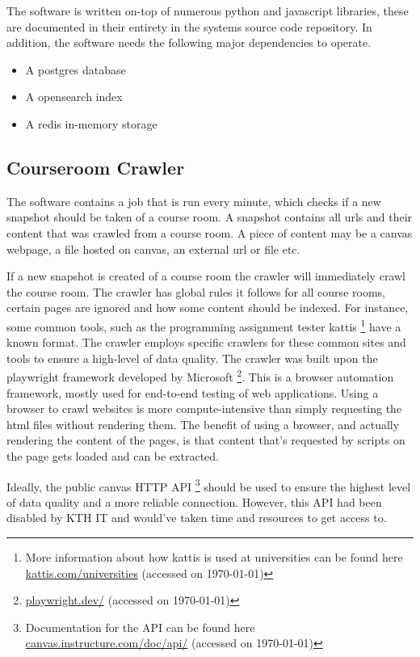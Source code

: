 The software is written on-top of numerous python and javascript libraries, these are documented in their entirety in the systems source code repository. In addition, the software needs the following major dependencies to operate.


\begin{itemize}
        \item A postgres database
        \item A opensearch index
        \item A redis in-memory storage
\end{itemize}


\subsection{Courseroom Crawler}


The software contains a job that is run every minute, which checks if a new snapshot should be taken of a course room. A snapshot contains all urls and their content that was crawled from a course room. A piece of content may be a canvas webpage, a file hosted on canvas, an external url or file etc.


If a new snapshot is created of a course room the crawler will immediately crawl the course room. The crawler has global rules it follows for all course rooms, certain pages are ignored and how some content should be indexed. For instance, some common tools, such as the programming assignment tester kattis \footnote{More information about how kattis is used at universities can be found here \href{https://www.kattis.com/universities}{kattis.com/universities} (accessed on \today)} have a known format. The crawler employs specific crawlers for these common sites and tools to ensure a high-level of data quality.
The crawler was built upon the playwright framework developed by Microsoft \footnote{\href{https://playwright.dev/}{playwright.dev/} (accessed on \today)}. This is a browser automation framework, mostly used for end-to-end testing of web applications. Using a browser to crawl websites is more compute-intensive than simply requesting the html files without rendering them. The benefit of using a browser, and actually rendering the content of the pages, is that content that’s requested by scripts on the page gets loaded and can be extracted.


Ideally, the public canvas HTTP API \footnote{Documentation for the API can be found here \href{https://canvas.instructure.com/doc/api/}{canvas.instructure.com/doc/api/} (accessed on \today)} should be used to ensure the highest level of data quality and a more reliable connection. However, this API had been disabled by KTH IT and would’ve taken time and resources to get access to.


